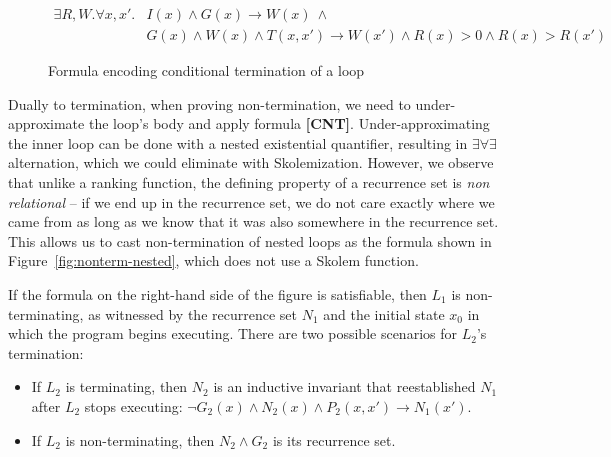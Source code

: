 \documentclass[a4paper]{llncs}
\begin{document}
\begin{figure*}
 \begin{framed}

\begin{definition}
\label{def:ct}
 \begin{align*}
  \exists R, W . \forall x, x' . & I(x) \wedge G(x) \rightarrow W(x) ~ \wedge \\
                                 & G(x) \wedge W(x) \wedge T(x, x') \rightarrow W(x') \wedge R(x) > 0 
  \wedge R(x) > R(x')
 \end{align*}
\end{definition}

 \end{framed}
\caption{Formula encoding conditional termination of a loop} \label{fig:conditional_termination}
\end{figure*}

Dually to termination, when proving non-termination, we need to
under-approximate the loop's body and apply formula {\bf [CNT]}.
%
% 
%
%
Under-approximating the inner loop can be done with a nested existential quantifier, resulting in
$\exists \forall \exists$ alternation, which we could eliminate with Skolemization.  
However, we observe that
unlike a ranking function,
the defining property of a recurrence set is \emph{non relational} -- if we
end up in the recurrence set, we do not care exactly where we came from as
long as we know that it was also somewhere in the recurrence set.  
This allows us to cast non-termination of nested loops as the formula shown in
Figure~\ref{fig:nonterm-nested}, which does not use a Skolem function.

If the formula on the right-hand side of the figure is satisfiable, then
$L_1$ is non-terminating, as witnessed by the recurrence set $N_1$ and the
initial state $x_0$ in which the program begins executing.  There are two
possible scenarios for $L_2$'s termination:
%
\begin{itemize}
%
\item If $L_2$ is terminating, then $N_2$ is an inductive invariant that
reestablished $N_1$ after $L_2$ stops executing: $\lnot G_2(x) \wedge N_2(x)
\wedge P_2(x,x') \rightarrow N_1(x') $.
%
\item If $L_2$ is non-terminating, then $N_2 \wedge G_2$ is its recurrence set.
%
\end{itemize}
\end{document}
